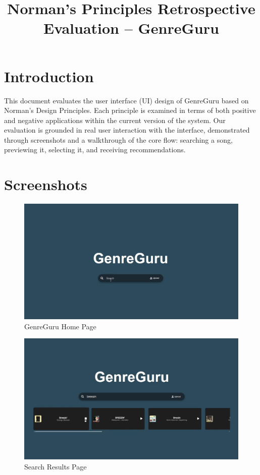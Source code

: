 \documentclass[12pt]{article}
\title{Norman’s Principles Retrospective Evaluation – GenreGuru}
\date{}
\begin{document}
\maketitle

\section*{Introduction}
This document evaluates the user interface (UI) design of GenreGuru based on Norman’s Design Principles. Each principle is examined in terms of both positive and negative applications within the current version of the system. Our evaluation is grounded in real user interaction with the interface, demonstrated through screenshots and a walkthrough of the core flow: searching a song, previewing it, selecting it, and receiving recommendations.

\section*{Screenshots}
\begin{figure}[H]
    \centering
    \includegraphics[width=\textwidth]{normans_principles_figures/img1.jpg}
    \caption{GenreGuru Home Page}
    \label{img1}
\end{figure}

\begin{figure}[H]
    \centering
    \includegraphics[width=\textwidth]{normans_principles_figures/img2.jpg}
    \caption{Search Results Page}
    \label{img2}
\end{figure}
\end{document}
